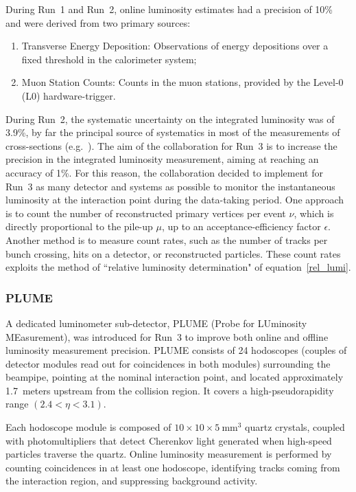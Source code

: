 During Run~1 and Run~2, online luminosity estimates had a precision of 10\% and were derived from two primary sources: 
\begin{enumerate}
    \item Transverse Energy Deposition: Observations of energy depositions over a fixed threshold in the calorimeter system;
    \item Muon Station Counts: Counts in the muon stations, provided by the Level-0 (L0) hardware-trigger.
\end{enumerate}
During Run~2, the systematic uncertainty on the integrated luminosity was of 3.9\%, by far the principal source of systematics in most of the measurements of cross-sections (e.g.~\cite{j-psi}). The aim of the collaboration for Run~3 is to increase the precision in the integrated luminosity measurement, aiming at reaching an accuracy of 1\%\cite{Aaij:1951625}. For this reason, the collaboration decided to implement for Run~3 as many detector and systems as possible to monitor the instantaneous luminosity at the interaction point during the data-taking period.
One approach is to count the number of reconstructed primary vertices per event $\nu$, which is directly proportional to the pile-up $\mu$, up to an acceptance-efficiency factor $\epsilon$. Another method is to measure count rates, such as the number of tracks per bunch crossing, hits on a detector, or reconstructed particles. These count rates exploits the method of ``relative luminosity determination" of equation~\eqref{rel_lumi}.

\subsubsection{PLUME}
A dedicated luminometer sub-detector, PLUME (Probe for LUminosity MEasurement), was introduced for Run~3 to improve both online and offline luminosity measurement precision. PLUME consists of 24 hodoscopes (couples of detector modules read out for coincidences in both modules) surrounding the beampipe, pointing at the nominal interaction point, and located approximately 1.7~meters upstream from the collision region. It covers a high-pseudorapidity range $(2.4 < \eta < 3.1)$.

Each hodoscope module is composed of $10 × 10 × \SI{5}{\milli\meter\tothe{3}}$ quartz crystals, coupled with photomultipliers that detect Cherenkov light generated when high-speed particles traverse the quartz. Online luminosity measurement is performed by counting coincidences in at least one hodoscope, identifying tracks coming from the interaction region, and suppressing background activity.

